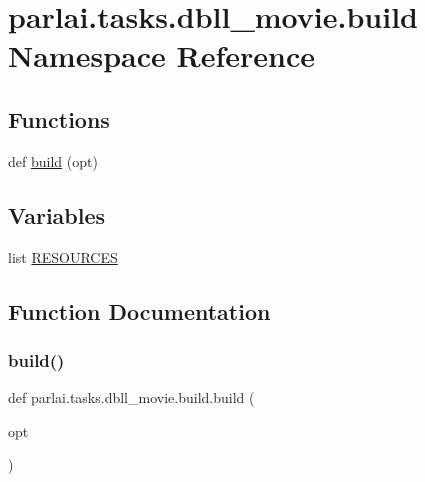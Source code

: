 \hypertarget{namespaceparlai_1_1tasks_1_1dbll__movie_1_1build}{}\section{parlai.\+tasks.\+dbll\+\_\+movie.\+build Namespace Reference}
\label{namespaceparlai_1_1tasks_1_1dbll__movie_1_1build}
\subsection*{Functions}
\begin{DoxyCompactItemize}
\item 
def \hyperlink{namespaceparlai_1_1tasks_1_1dbll__movie_1_1build_a5e884d505c1311a6afaaf8a587e4708f}{build} (opt)
\end{DoxyCompactItemize}
\subsection*{Variables}
\begin{DoxyCompactItemize}
\item 
list \hyperlink{namespaceparlai_1_1tasks_1_1dbll__movie_1_1build_acd0aebde6c9b95583970843821abb78e}{R\+E\+S\+O\+U\+R\+C\+ES}
\end{DoxyCompactItemize}


\subsection{Function Documentation}
\mbox{\label{namespaceparlai_1_1tasks_1_1dbll__movie_1_1build_a5e884d505c1311a6afaaf8a587e4708f}} 
\subsubsection{\texorpdfstring{build()}{build()}}
{\footnotesize\ttfamily def parlai.\+tasks.\+dbll\+\_\+movie.\+build.\+build (\begin{DoxyParamCaption}\item[{}]{opt }\end{DoxyParamCaption})}



